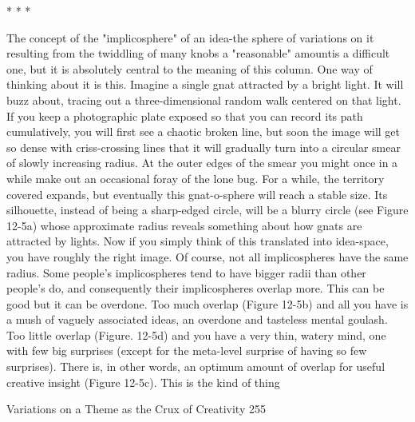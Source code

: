                                         *   *   *

         The concept of the "implicosphere" of an idea-the sphere of variations on it
resulting from the twiddling of many knobs a "reasonable" amountis a difficult one,
but it is absolutely central to the meaning of this column. One way of thinking about it
is this. Imagine a single gnat attracted by a bright light. It will buzz about, tracing out
a three-dimensional random walk centered on that light. If you keep a photographic
plate exposed so that you can record its path cumulatively, you will first see a chaotic
broken line, but soon the image will get so dense with criss-crossing lines that it will
gradually turn into a circular smear of slowly increasing radius. At the outer edges of
the smear you might once in a while make out an occasional foray of the lone bug.
For a while, the territory covered expands, but eventually this gnat-o-sphere will reach
a stable size. Its silhouette, instead of being a sharp-edged circle, will be a blurry
circle (see Figure 12-5a) whose approximate radius reveals something about how
gnats are attracted by lights.
         Now if you simply think of this translated into idea-space, you have roughly
the right image. Of course, not all implicospheres have the same radius. Some
people's implicospheres tend to have bigger radii than other people's do, and
consequently their implicospheres overlap more. This can be good but it can be
overdone. Too much overlap (Figure 12-5b) and all you have is a mush of vaguely
associated ideas, an overdone and tasteless mental goulash. Too little overlap (Figure.
12-5d) and you have a very thin, watery mind, one with few big surprises (except for
the meta-level surprise of having so few surprises). There is, in other words, an
optimum amount of overlap for useful creative insight (Figure 12-5c). This is the kind
of thing




Variations on a Theme as the Crux of Creativity                                        255

